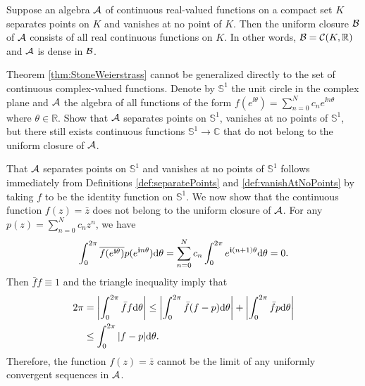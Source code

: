 \begin{thm}
  \label{thm:StoneWeierstrass}
  Suppose an algebra ${\cal A}$ of continuous real-valued functions
  on a compact set $K$
  separates points on $K$ and vanishes at no point of $K$.
  Then the uniform closure ${\cal B}$ of ${\cal A}$
  consists of all real continuous functions on $K$. 
  In other words, ${\cal B}={\cal C}(K, \mathbb{R})$
  and ${\cal A}$ is dense in ${\cal B}$.
\end{thm}

\begin{exc}
  Theorem \ref{thm:StoneWeierstrass}
  cannot be generalized directly to
  the set of continuous complex-valued functions.
  Denote by $\mathbb{S}^1$ the unit circle in the complex plane
  and ${\cal A}$ the algebra of all functions of the form
  $f(e^{\ii \theta}) = \sum_{n=0}^N c_n e^{\ii n\theta}$
  where $\theta\in \mathbb{R}$.
  Show that ${\cal A}$ separates points on $\mathbb{S}^1$,
  vanishes at no points of $\mathbb{S}^1$,
  but there still exists continuous functions
  $\mathbb{S}^1\rightarrow \mathbb{C}$
  that do not belong to the uniform closure of ${\cal A}$. 
\end{exc}
\begin{solution}
  That ${\cal A}$ separates points on $\mathbb{S}^1$ and
  vanishes at no points of $\mathbb{S}^1$ follows
  immediately from Definitions \ref{def:separatePoints} and
  \ref{def:vanishAtNoPoints}
  by taking $f$ to be the identity function on $\mathbb{S}^1$.
  We now show that the continuous function $f(z) = \bar{z}$
  does not belong to the uniform closure of ${\cal A}$.
  For any $p(z) = \sum_{n=0}^Nc_nz^n$,
  we have
  \begin{equation*}
    \int_0^{2\pi}\overline{f(e^{\mathbf{i}\theta})}p(e^{\mathbf{i}n\theta})\mathrm{d}\theta =
    \sum_{n=0}^Nc_n\int_0^{2\pi}e^{\mathbf{i}(n+1)\theta}\mathrm{d}\theta = 0.
  \end{equation*}
  Then $\bar{f}f\equiv 1$ and the triangle inequality imply that
  \begin{align*}
    2\pi &= \left| \int_0^{2\pi}\bar{f}f\mathrm{d}\theta \right| \le
           \left| \int_0^{2\pi}\bar{f}(f - p)\mathrm{d}\theta \right| + \left| \int_0^{2\pi}\bar{f}p\mathrm{d}\theta \right| \\
    &\le \int_0^{2\pi}|f - p|\mathrm{d}\theta.
  \end{align*}
  Therefore,
  the function $f(z) = \bar{z}$ cannot be
  the limit of any uniformly convergent sequences in ${\cal A}$.
\end{solution}

